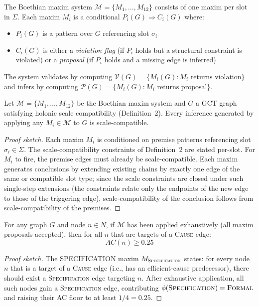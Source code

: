 \documentclass{iosart2x}
\begin{document}
\begin{definition}
The Boethian maxim system $\mathcal{M} = \{M_1, \ldots, M_{12}\}$ consists of one maxim per slot in $\Sigma$. Each maxim $M_i$ is a conditional $P_i(G) \Rightarrow C_i(G)$ where:
\begin{itemize}
  \item $P_i(G)$ is a pattern over $G$ referencing slot $\sigma_i$
  \item $C_i(G)$ is either a \emph{violation flag} (if $P_i$ holds but a structural constraint is violated) or a \emph{proposal} (if $P_i$ holds and a missing edge is inferred)
\end{itemize}
The system validates by computing $\mathcal{V}(G) = \{M_i(G) : M_i \text{ returns violation}\}$ and infers by computing $\mathcal{P}(G) = \{M_i(G) : M_i \text{ returns proposal}\}$.
\end{definition}

\begin{proposition}
Let $\mathcal{M} = \{M_1, \ldots, M_{12}\}$ be the Boethian maxim system and $G$ a GCT graph satisfying holonic scale compatibility (Definition~2). Every inference generated by applying any $M_i \in \mathcal{M}$ to $G$ is scale-compatible.
\end{proposition}

\begin{proof}[Proof sketch]
Each maxim $M_i$ is conditioned on premise patterns referencing slot $\sigma_i \in \Sigma$. The scale-compatibility constraints of Definition~2 are stated per-slot. For $M_i$ to fire, the premise edges must already be scale-compatible. Each maxim generates conclusions by extending existing chains by exactly one edge of the same or compatible slot type; since the scale constraints are closed under such single-step extensions (the constraints relate only the endpoints of the new edge to those of the triggering edge), scale-compatibility of the conclusion follows from scale-compatibility of the premises.
\end{proof}

\begin{proposition}
For any graph $G$ and node $n \in N$, if $\mathcal{M}$ has been applied exhaustively (all maxim proposals accepted), then for all $n$ that are targets of a \textsc{Cause} edge:
\[
\mathit{AC}(n) \geq 0.25
\]
\end{proposition}

\begin{proof}[Proof sketch]
The SPECIFICATION maxim $M_{\textsc{Specification}}$ states: for every node $n$ that is a target of a \textsc{Cause} edge (i.e., has an efficient-cause predecessor), there should exist a \textsc{Specification} edge targeting $n$. After exhaustive application, all such nodes gain a \textsc{Specification} edge, contributing $\phi(\textsc{Specification}) = \textsc{Formal}$ and raising their AC floor to at least $1/4 = 0.25$.
\end{proof}
\end{document}
